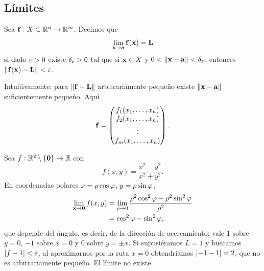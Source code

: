 \subsection{L\'imites}
\label{subsec:limites_vectoriales}

\begin{definicion}
  \label{def:limite_vectorial}
  Sea $\mathbf{f}:X\subset\mathbb{R}^n\rightarrow\mathbb{R}^m$. Decimos que
  \begin{equation}
    \label{eq:limite_vectorial}
    \lim_{\mathbf{x}\rightarrow\mathbf{a}}\mathbf{f}(\mathbf{x})=\mathbf{L}
  \end{equation}
  si dado $\varepsilon>0$ existe $\delta_\varepsilon>0$ tal que si $\mathbf{x}\in X$ y
  $0<\lVert \mathbf{x}-\mathbf{a} \rVert<\delta_\varepsilon$, entonces
  $\lVert \mathbf{f}(\mathbf{x})-\mathbf{L} \rVert<\varepsilon$.
\end{definicion}

Intuitivamente: para $\lVert \mathbf{f}-\mathbf{L} \rVert$ arbitrariamente peque\~no existe
$\lVert \mathbf{x}-\mathbf{a} \rVert$ suficientemente peque\~no. Aqu\'i
\begin{equation}
  \label{eq:componentes_f}
  \mathbf{f}=
  \begin{pmatrix}
    f_1(x_1,\dots,x_n)\\
    f_2(x_1,\dots,x_n)\\
    \vdots\\
    f_m(x_1,\dots,x_n)
  \end{pmatrix}.
\end{equation}

\begin{ejemplo}
  \label{ej:limite_direccional}
  Sea $f:\mathbb{R}^2\setminus\left\{ \mathbf{0} \right\}\rightarrow\mathbb{R}$ con
  \begin{equation}
    \label{eq:f_direccional}
    f(x,y)=\frac{x^2-y^2}{x^2+y^2}.
  \end{equation}
  En coordenadas polares $x=\rho\cos\varphi$, $y=\rho\sin\varphi$,
  \begin{equation}
    \label{eq:limite_direccional}
    \begin{aligned}
      \lim_{\mathbf{x}\rightarrow\mathbf{0}}f(x,y)
        &=\lim_{\rho\rightarrow 0}
          \frac{\rho^2\cos^2\varphi-\rho^2\sin^2\varphi}{\rho^2}\\
        &=\cos^2\varphi-\sin^2\varphi ,
    \end{aligned}
  \end{equation}
  que depende del \'angulo, es decir, de la direcci\'on de acercamiento: vale
  $1$ sobre $y=0$, $-1$ sobre $x=0$ y $0$ sobre $y=\pm x$. Si supusi\'eramos
  $L=1$ y buscamos $\lvert f-1 \rvert<\varepsilon$, al aproximarnos por la ruta $x=0$
  obtendr\'iamos $\lvert -1-1 \rvert=2$, que no es arbitrariamente peque\~no. El
  l\'imite no existe.
\end{ejemplo}

